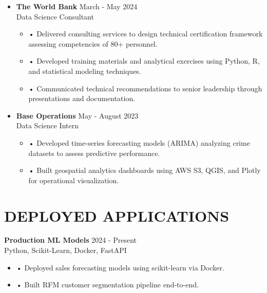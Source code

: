 \documentclass[a4paper,9pt]{extarticle}
\begin{document}
\noindent
\begin{itemize}[leftmargin=0.4cm, label={}]
    \item \textbf{The World Bank} \hfill March - May 2024 \\
    Data Science Consultant
    \vspace{-0.1cm}
    \begin{itemize}[leftmargin=0.3cm, label={}]
    \item \small{•} \normalsize{Delivered consulting services to design technical certification framework assessing competencies of 80+ personnel.}
    \item \small{•} \normalsize{Developed training materials and analytical exercises using Python, R, and statistical modeling techniques.}
    \item \small{•} \normalsize{Communicated technical recommendations to senior leadership through presentations and documentation.}
    \end{itemize}
\end{itemize}

\noindent
\begin{itemize}[leftmargin=0.4cm, label={}]
    \item \textbf{Base Operations} \hfill May - August 2023 \\
    Data Science Intern
    \vspace{-0.1cm}
    \begin{itemize}[leftmargin=0.3cm, label={}]
    \item \small{•} \normalsize{Developed time-series forecasting models (ARIMA) analyzing crime datasets to assess predictive performance.}
    \item \small{•} \normalsize{Built geospatial analytics dashboards using AWS S3, QGIS, and Plotly for operational visualization.}
    \end{itemize}
\end{itemize}

\section*{DEPLOYED APPLICATIONS}

\item \textbf{Production ML Models} \hfill 2024 - Present \\ Python, Scikit-Learn, Docker, FastAPI
\begin{itemize}[leftmargin=0.3cm, label={}]
\item \small{•} \normalsize{Deployed sales forecasting models using scikit-learn via Docker.}
\item \small{•} \normalsize{Built RFM customer segmentation pipeline end-to-end.}
\end{itemize}
\end{document}

